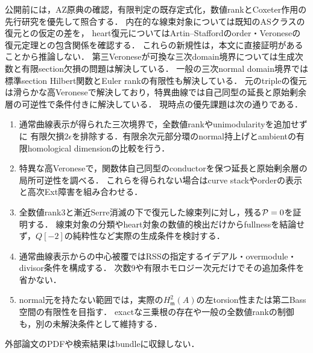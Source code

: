 \documentclass[11pt,a4paper]{ltjsarticle}
\begin{document}
公開前には，AZ原典の確認，有限判定の既存定式化，数値rankとCoxeter作用の先行研究を優先して照合する．
内在的な線束対象については既知のASクラスの復元との仮定の差を，
heart復元についてはArtin--Staffordのorder・Veroneseの復元定理との包含関係を確認する．
これらの新規性は，本文に直接証明があることから推論しない．
第三Veroneseが可換な三次domain境界については生成次数と有限section欠損の問題は解決している．
一般の三次normal domain境界では標準section Hilbert関数とEuler rankの有限性も解決している．
元のtripleの復元は滑らかな高Veroneseで解決しており，特異曲線では自己同型の延長と原始剰余層の可逆性で条件付きに解決している．
現時点の優先課題は次の通りである．
\begin{enumerate}[label=(\arabic*)]
\item 通常曲線表示が得られた三次境界で，全数値rankやunimodularityを追加せずに
有限欠損$2\epsilon$を排除する．有限余次元部分環のnormal持上げとambientの有限homological dimensionの比較を行う．
\item 特異な高Veroneseで，関数体自己同型のconductorを保つ延長と原始剰余層の局所可逆性を調べる．
これらを得られない場合はcurve stackやorderの表示と高次Ext障害を組み合わせる．
\item 全数値rank3と漸近Serre消滅の下で復元した線束列に対し，残る$\mathcal P=0$を証明する．
線束対象の分類やheart対象の数値的検出だけからfullnessを結論せず，$Q[-2]$の純粋性など実際の生成条件を検討する．
\item 通常曲線表示からの中心被覆ではRSSの指定するイデアル・overmodule・divisor条件を構成する．
次数9や有限ホモロジー次元だけでその追加条件を省かない．
\item normal元を持たない範囲では，実際の$H^2_{\mathfrak m}(A)$の左torsion性または第二Bass空間の有限性を目指す．
exactな三乗根の存在や一般の全数値rankの制御も，別の未解決条件として維持する．
\end{enumerate}
外部論文のPDFや検索結果はbundleに収録しない．
\end{document}
